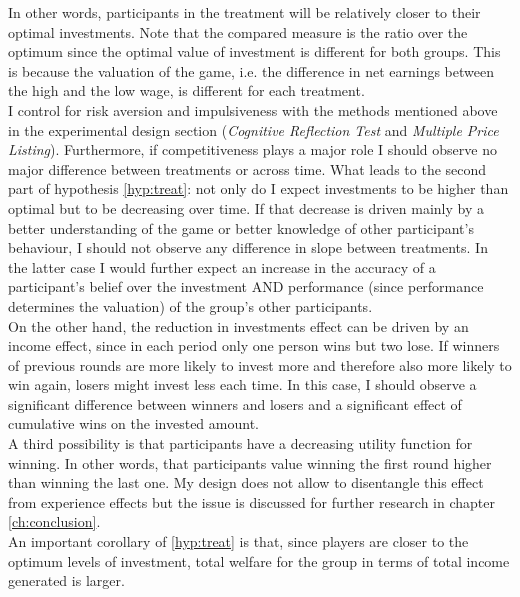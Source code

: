     In other words, participants in the treatment will be relatively closer to their optimal investments. Note that the compared measure is the ratio over the optimum since the optimal value of investment is different for both groups. This is because the valuation of the game, i.e. the difference in net earnings between the high and the low wage, is different for each treatment.\\ 
    
    I control for risk aversion and impulsiveness with the methods mentioned above in the experimental design section (\textit{Cognitive Reflection Test} and \textit{Multiple Price Listing}). Furthermore, if competitiveness plays a major role I should observe no major difference between treatments or across time. What leads to the second part of hypothesis \ref{hyp:treat}: not only do I expect investments to be higher than optimal but to be decreasing over time. If that decrease is driven mainly by a better understanding of the game or better knowledge of other participant's behaviour, I should not observe any difference in slope between treatments. In the latter case I would further expect an increase in the accuracy of a participant's belief over the investment AND performance (since performance determines the valuation) of the group's other participants.\\
    
    On the other hand, the reduction in investments effect can be driven by an income effect, since in each period only one person wins but two lose. If winners of previous rounds are more likely to invest more and therefore also more likely to win again, losers might invest less each time.  In this case, I should observe a significant difference between winners and losers and a significant effect of cumulative wins on the invested amount.\\
    
    A third possibility is that participants have a decreasing utility function for winning. In other words, that participants value winning the first round higher than winning the last one. My design does not allow to disentangle this effect from experience effects but the issue is discussed for further research in chapter \ref{ch:conclusion}.\\
      
    An important corollary of \cref{hyp:treat} is that, since players are closer to the optimum levels of investment, total welfare for the group in terms of total income generated is larger.\\
    
